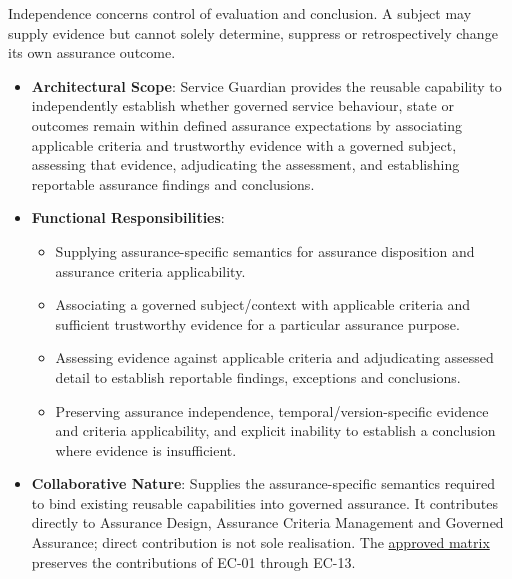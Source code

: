 Independence concerns control of evaluation and conclusion. A subject may supply evidence but cannot solely determine, suppress or retrospectively change its own assurance outcome.



\begin{itemize}

\item
\textbf{Architectural Scope}: Service Guardian provides the reusable capability to independently establish whether governed service behaviour, state or outcomes remain within defined assurance expectations by associating applicable criteria and trustworthy evidence with a governed subject, assessing that evidence, adjudicating the assessment, and establishing reportable assurance findings and conclusions.



\item
\textbf{Functional Responsibilities}:


\begin{itemize}

\item
Supplying assurance-specific semantics for assurance disposition and assurance criteria applicability.



\item
Associating a governed subject/\allowbreak{}context with applicable criteria and sufficient trustworthy evidence for a particular assurance purpose.



\item
Assessing evidence against applicable criteria and adjudicating assessed detail to establish reportable findings, exceptions and conclusions.



\item
Preserving assurance independence, temporal/\allowbreak{}version-specific evidence and criteria applicability, and explicit inability to establish a conclusion where evidence is insufficient.



\end{itemize}


\item
\textbf{Collaborative Nature}: Supplies the assurance-specific semantics required to bind existing reusable capabilities into governed assurance. It contributes directly to Assurance Design, Assurance Criteria Management and Governed Assurance; direct contribution is not sole realisation. The \href{https://github.com/fhirfactory/harmonia/blob/98410db60155198a75f74c79d98060070209faa1/docs/markdown/02-strategy/capability-maps/health-service-assurance-derivation.md\#collaborative-enterprise-capability-contribution-matrix}{approved matrix} preserves the contributions of EC-01 through EC-13.




\end{itemize}

